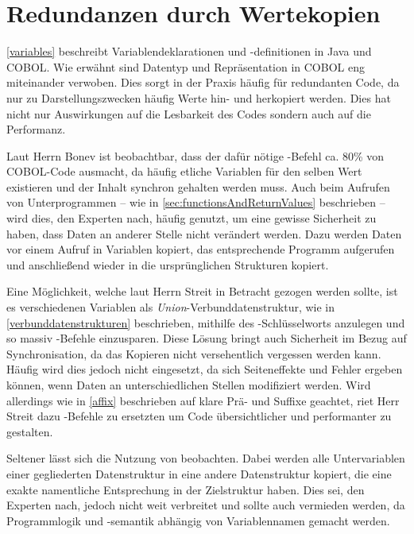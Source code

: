 \section{Redundanzen durch Wertekopien}
\autoref{variables} beschreibt Variablendeklarationen und -definitionen in Java und COBOL. Wie erwähnt sind Datentyp und Repräsentation in COBOL eng miteinander verwoben. Dies sorgt in der Praxis häufig für redundanten Code, da nur zu Darstellungszwecken häufig Werte hin- und herkopiert werden. Dies hat nicht nur Auswirkungen auf die Lesbarkeit des Codes sondern auch auf die Performanz.

Laut Herrn Bonev ist beobachtbar, dass der dafür nötige -Befehl ca. 80\% von COBOL-Code ausmacht, da häufig etliche Variablen für den selben Wert existieren und der Inhalt synchron gehalten werden muss. Auch beim Aufrufen von Unterprogrammen -- wie in \autoref{sec:functionsAndReturnValues} beschrieben -- wird dies, den Experten nach, häufig genutzt, um eine gewisse Sicherheit zu haben, dass Daten an anderer Stelle nicht verändert werden. Dazu werden Daten vor einem Aufruf in Variablen kopiert, das entsprechende Programm aufgerufen und anschließend wieder in die ursprünglichen Strukturen kopiert. 

Eine Möglichkeit, welche laut Herrn Streit in Betracht gezogen werden sollte, ist es verschiedenen Variablen als \textit{Union}-Verbunddatenstruktur, wie in \autoref{verbunddatenstrukturen} beschrieben, mithilfe des -Schlüsselworts anzulegen und so massiv -Befehle einzusparen. Diese Lösung bringt auch Sicherheit im Bezug auf Synchronisation, da das Kopieren nicht versehentlich vergessen werden kann. Häufig wird dies jedoch nicht eingesetzt, da sich Seiteneffekte und Fehler ergeben können, wenn Daten an unterschiedlichen Stellen modifiziert werden. Wird allerdings wie in \autoref{affix} beschrieben auf klare Prä- und Suffixe geachtet, riet Herr Streit dazu -Befehle zu ersetzten um Code übersichtlicher und performanter zu gestalten.

Seltener lässt sich die Nutzung von  beobachten. Dabei werden alle Untervariablen einer gegliederten Datenstruktur in eine andere Datenstruktur kopiert, die eine exakte namentliche Entsprechung in der Zielstruktur haben. Dies sei, den Experten nach, jedoch nicht weit verbreitet und sollte auch vermieden werden, da Programmlogik und -semantik abhängig von Variablennamen gemacht werden.